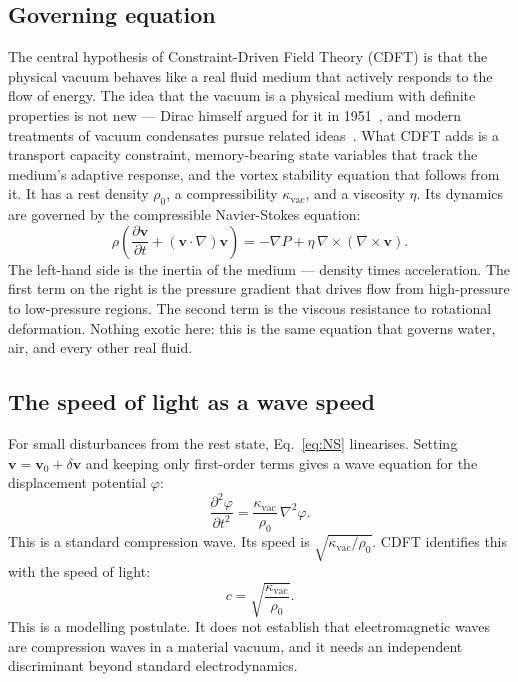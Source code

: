 \documentclass[11pt]{article}
\begin{document}
\subsection{Governing equation}

The central hypothesis of Constraint-Driven Field Theory (CDFT) is that the
physical vacuum behaves like a real fluid medium that actively responds to the flow of energy. The idea that the vacuum is a
physical medium with definite properties is not new --- Dirac himself argued for
it in 1951~\cite{Dirac1951}, and modern treatments of vacuum condensates pursue
related ideas~\cite{Consoli2008}. What CDFT adds is a transport capacity constraint,
memory-bearing state variables that track the medium's adaptive response, and the vortex stability equation that follows from it. It has a rest density $\rho_0$,
a compressibility $\kappa_\text{vac}$, and a viscosity $\eta$. Its dynamics are
governed by the compressible Navier-Stokes equation:
\begin{equation}
  \rho\left(\frac{\partial \bm{v}}{\partial t}
  + (\bm{v}\cdot\nabla)\bm{v}\right)
  = -\nabla P + \eta\,\nabla\times(\nabla\times\bm{v}).
  \label{eq:NS}
\end{equation}
The left-hand side is the inertia of the medium --- density times acceleration.
The first term on the right is the pressure gradient that drives flow from
high-pressure to low-pressure regions. The second term is the viscous resistance
to rotational deformation. Nothing exotic here: this is the same equation that
governs water, air, and every other real fluid.

\subsection{The speed of light as a wave speed}

For small disturbances from the rest state, Eq.~\eqref{eq:NS} linearises.
Setting $\bm{v} = \bm{v}_0 + \delta\bm{v}$ and keeping only first-order terms
gives a wave equation for the displacement potential $\varphi$:
\begin{equation}
  \frac{\partial^2 \varphi}{\partial t^2}
  = \frac{\kappa_\text{vac}}{\rho_0}\,\nabla^2\varphi.
  \label{eq:wave}
\end{equation}
This is a standard compression wave. Its speed is $\sqrt{\kappa_\text{vac}/\rho_0}$.
CDFT identifies this with the speed of light:
\begin{equation}
  c = \sqrt{\frac{\kappa_\text{vac}}{\rho_0}}.
  \label{eq:c}
\end{equation}
This is a modelling postulate. It does not establish that electromagnetic waves
are compression waves in a material vacuum, and it needs an independent
discriminant beyond standard electrodynamics.
\end{document}
